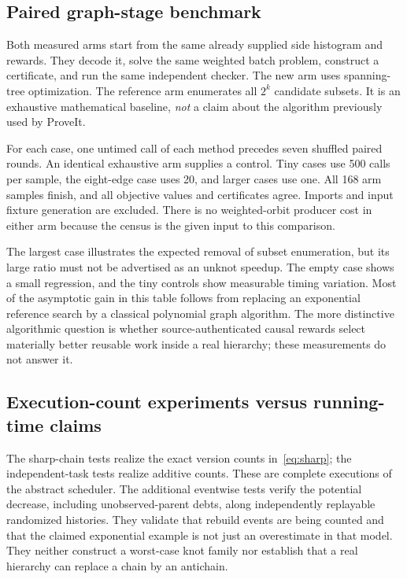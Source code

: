 \documentclass[11pt]{article}
\theoremstyle{definition}
\begin{document}
\subsection{Paired graph-stage benchmark}
Both measured arms start from the same already supplied side histogram and rewards. They decode it, solve the same weighted batch problem, construct a certificate, and run the same independent checker. The new arm uses spanning-tree optimization. The reference arm enumerates all $2^k$ candidate subsets. It is an exhaustive mathematical baseline, \emph{not} a claim about the algorithm previously used by ProveIt.

For each case, one untimed call of each method precedes seven shuffled paired rounds. An identical exhaustive arm supplies a control. Tiny cases use 500 calls per sample, the eight-edge case uses 20, and larger cases use one. All 168 arm samples finish, and all objective values and certificates agree. Imports and input fixture generation are excluded. There is no weighted-orbit producer cost in either arm because the census is the given input to this comparison.

\begin{table}[ht]
\centering\small

\caption{Complete graph-stage calls, including certificate replay. Ratio is the median paired exhaustive/new ratio; control is the median identical exhaustive-control/exhaustive ratio. These are local graph-query measurements, not recognition gains.}\label{tab:benchmark}
\end{table}

The largest case illustrates the expected removal of subset enumeration, but its large ratio must not be advertised as an unknot speedup. The empty case shows a small regression, and the tiny controls show measurable timing variation. Most of the asymptotic gain in this table follows from replacing an exponential reference search by a classical polynomial graph algorithm. The more distinctive algorithmic question is whether source-authenticated causal rewards select materially better reusable work inside a real hierarchy; these measurements do not answer it.

\subsection{Execution-count experiments versus running-time claims}
The sharp-chain tests realize the exact version counts in~\eqref{eq:sharp}; the independent-task tests realize additive counts. These are complete executions of the abstract scheduler. The additional eventwise tests verify the potential decrease, including unobserved-parent debts, along independently replayable randomized histories. They validate that rebuild events are being counted and that the claimed exponential example is not just an overestimate in that model. They neither construct a worst-case knot family nor establish that a real hierarchy can replace a chain by an antichain.
\end{document}
